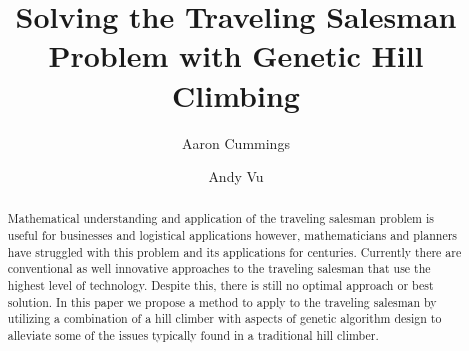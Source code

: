 \documentclass[sigplan,screen]{acmart}
\begin{document}
\title{Solving the Traveling Salesman Problem with Genetic Hill Climbing}

\author{Aaron Cummings}

\author{Andy Vu}
\authornotemark[1]

\renewcommand{\shortauthors}{Cummings et al.}

\begin{abstract}
    Mathematical understanding and application of the traveling salesman problem
    is useful for businesses and logistical applications however, mathematicians
    and planners have struggled with this problem and its applications for
    centuries. Currently there are conventional as well innovative approaches to
    the traveling salesman that use the highest level of technology. Despite
    this, there is still no optimal approach or best solution. In this paper we
    propose a method to apply to the traveling salesman by utilizing a
    combination of a hill climber with aspects of genetic algorithm design to
    alleviate some of the issues typically found in a traditional hill climber.
\end{abstract}

\end{document}
